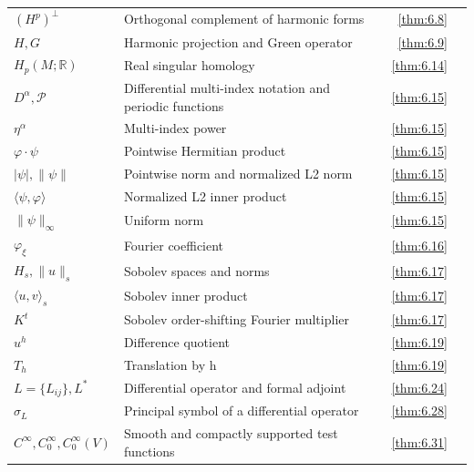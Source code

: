 {\begin{longtable}{@{}>{\raggedright\arraybackslash}p{.39\linewidth}>{\raggedright\arraybackslash}p{.39\linewidth}r r@{}}
$(H^p)^\perp$ & Orthogonal complement of harmonic forms & \ref{thm:6.8} & \pageref{thm:6.8} \\
$H,\allowbreak G$ & Harmonic projection and Green operator & \ref{thm:6.9} & \pageref{thm:6.9} \\
$H_p(M;\mathbb R)$ & Real singular homology & \ref{thm:6.14} & \pageref{thm:6.14} \\
$D^\alpha,\allowbreak \mathcal P$ & Differential multi-index notation and periodic functions & \ref{thm:6.15} & \pageref{thm:6.15} \\
$\eta^\alpha$ & Multi-index power & \ref{thm:6.15} & \pageref{thm:6.15} \\
$\varphi\cdot\psi$ & Pointwise Hermitian product & \ref{thm:6.15} & \pageref{thm:6.15} \\
$|\psi|,\allowbreak \|\psi\|$ & Pointwise norm and normalized L2 norm & \ref{thm:6.15} & \pageref{thm:6.15} \\
$\langle\psi,\allowbreak \varphi\rangle$ & Normalized L2 inner product & \ref{thm:6.15} & \pageref{thm:6.15} \\
$\|\psi\|_\infty$ & Uniform norm & \ref{thm:6.15} & \pageref{thm:6.15} \\
$\varphi_\xi$ & Fourier coefficient & \ref{thm:6.16} & \pageref{thm:6.16} \\
$H_s,\allowbreak \|u\|_s$ & Sobolev spaces and norms & \ref{thm:6.17} & \pageref{thm:6.17} \\
$\langle u,\allowbreak v\rangle_s$ & Sobolev inner product & \ref{thm:6.17} & \pageref{thm:6.17} \\
$K^t$ & Sobolev order-shifting Fourier multiplier & \ref{thm:6.17} & \pageref{thm:6.17} \\
$u^h$ & Difference quotient & \ref{thm:6.19} & \pageref{thm:6.19} \\
$T_h$ & Translation by h & \ref{thm:6.19} & \pageref{thm:6.19} \\
$L=\{L_{ij}\},\allowbreak L^*$ & Differential operator and formal adjoint & \ref{thm:6.24} & \pageref{thm:6.24} \\
$\sigma_L$ & Principal symbol of a differential operator & \ref{thm:6.28} & \pageref{thm:6.28} \\
$C^\infty,\allowbreak C_0^\infty,\allowbreak C_0^\infty(V)$ & Smooth and compactly supported test functions & \ref{thm:6.31} & \pageref{thm:6.31} \\
\end{longtable}}
